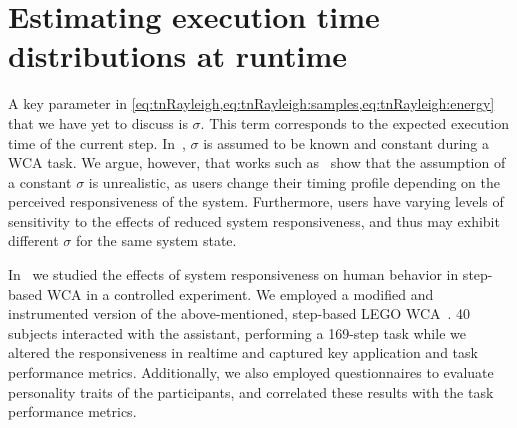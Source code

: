 \section{Estimating execution time distributions at runtime}\label{sec:model}

A key parameter in \cref{eq:tnRayleigh,eq:tnRayleigh:samples,eq:tnRayleigh:energy} that we have yet to discuss is \ensuremath{\sigma}.
This term corresponds to the expected execution time of the current step.
In~\cite{moothedath2021energy,moothedath2022energy1,moothedath2022energy2}, \ensuremath{\sigma} is assumed to be known and constant during a \gls{WCA} task.
We argue, however, that works such as~\cite{olguinmunoz2021impact} show that the assumption of a constant \ensuremath{\sigma} is unrealistic, as users change their timing profile depending on the perceived responsiveness of the system.
Furthermore, users have varying levels of sensitivity to the effects of reduced system responsiveness, and thus may exhibit different \ensuremath{\sigma} for the same system state.

In~\cite{olguinmunoz2021impact} we studied the effects of system responsiveness on human behavior in step-based \gls{WCA} in a controlled experiment.
We employed a modified and instrumented version of the above-mentioned, step-based LEGO \gls{WCA}~\cite{chen2015early}.
\num{40} subjects interacted with the assistant, performing a \num{169}-step task while we altered the responsiveness in realtime and captured key application and task performance metrics.
Additionally, we also employed questionnaires to evaluate personality traits of the participants, and correlated these results with the task performance metrics.

